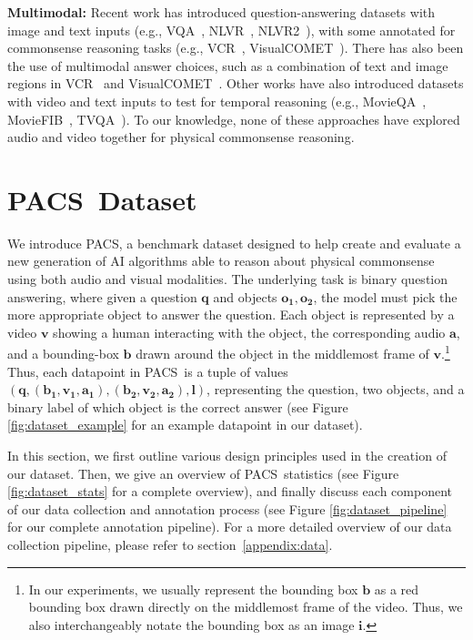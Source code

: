 \documentclass[runningheads]{llncs}
\newcommand{\names}{\textsc{PACS}}
\begin{document}
\noindent
\textbf{Multimodal:} Recent work has introduced question-answering datasets with image and text inputs (e.g., VQA~\cite{antol2015vqa}, NLVR~\cite{suhr2017nlvr}, NLVR2~\cite{suhr2019nlvr2}), with some annotated for commonsense reasoning tasks (e.g., VCR~\cite{zellers2019vcr,zellers2022merlotreserve}, VisualCOMET~\cite{park2020visualcomet}). There has also been the use of multimodal answer choices, such as a combination of text and image regions in VCR~\cite{zellers2019vcr} and VisualCOMET~\cite{park2020visualcomet}. Other works have also introduced datasets with video and text inputs to test for temporal reasoning (e.g., MovieQA~\cite{tapaswi2016movieqa}, MovieFIB~\cite{maharaj2017dataset}, TVQA~\cite{lei2018tvqa,zellers2022merlotreserve}). To our knowledge, none of these approaches have explored audio and video together for physical commonsense reasoning.


\section{\names\ Dataset}


We introduce \names, a benchmark dataset designed to help create and evaluate a new generation of AI algorithms able to reason about physical commonsense using both audio and visual modalities. The underlying task is binary question answering, where given a question $\boldsymbol{q}$ and objects $\boldsymbol{o_1}, \boldsymbol{o_2}$, the model must pick the more appropriate object to answer the question. Each object is represented by a video $\boldsymbol{v}$ showing a human interacting with the object, the corresponding audio $\boldsymbol{a}$, and a bounding-box $\boldsymbol{b}$ drawn around the object in the middlemost frame of $\boldsymbol{v}$.\footnote{In our experiments, we usually represent the bounding box $\boldsymbol{b}$ as a red bounding box drawn directly on the middlemost frame of the video. Thus, we also interchangeably notate the bounding box as an image $\boldsymbol{i}$.} Thus, each datapoint in \names\ is a tuple of values $(\boldsymbol{q}, (\boldsymbol{b_1}, \boldsymbol{v_1}, \boldsymbol{a_1}), (\boldsymbol{b_2}, \boldsymbol{v_2}, \boldsymbol{a_2}), \boldsymbol{l})$, representing the question, two objects, and a binary label of which object is the correct answer (see Figure \ref{fig:dataset_example} for an example datapoint in our dataset).


In this section, we first outline various design principles used in the creation of our dataset. Then, we give an overview of \names\ statistics (see Figure \ref{fig:dataset_stats} for a complete overview), and finally discuss each component of our data collection and annotation process (see Figure \ref{fig:dataset_pipeline} for our complete annotation pipeline). For a more detailed overview of our data collection pipeline, please refer to section~\ref{appendix:data}.
\end{document}
